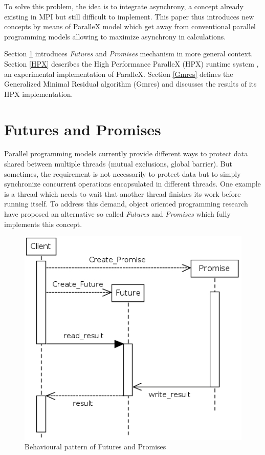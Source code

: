 \documentclass[smallextended]{svjour3}
\begin{document}
To solve this problem, the idea is to integrate asynchrony, a concept already existing in MPI but still difficult to implement. This paper thus introduces new concepts by means of ParalleX model which get away from conventional parallel programming models allowing to maximize asynchrony in calculations.\smallskip

Section \ref{Futures} introduces \emph{Futures} and \emph{Promises} mechanism in more general context. Section \ref{HPX} describes the High Performance ParalleX (HPX) runtime system \cite{ParalleX}, an experimental implementation of ParalleX. Section \ref{Gmres} defines the Generalized Minimal Residual algorithm (Gmres) \cite{GMRES} and discusses the results of its HPX implementation.

\section{Futures and Promises}\label{Futures}
Parallel programming models currently provide different ways to protect data shared between multiple threads (mutual exclusions, global barrier). But sometimes, the requirement is not necessarily to protect data but to simply synchronize concurrent operations encapsulated in different threads. One example is a thread which needs to wait that another thread finishes its work before running itself. To address this demand, object oriented programming research have proposed an alternative so called \emph{Futures} and \emph{Promises} \cite{Futures1} \cite{Futures2} which fully implements this concept.

\begin{figure}[h]
\begin{center}
\includegraphics[scale=0.5]{Images/Im1.jpeg}
\end{center}
\caption{Behavioural pattern of Futures and Promises}
\label{thread}
\end{figure}
\end{document}
